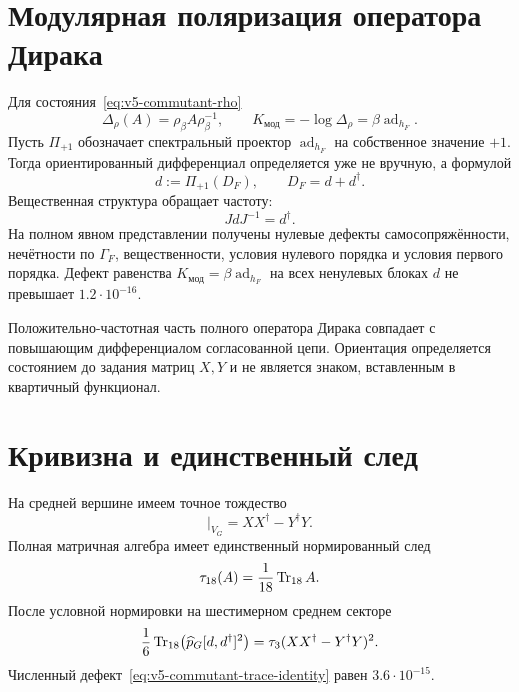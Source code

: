 \section{Модулярная поляризация оператора Дирака}

Для состояния~\eqref{eq:v5-commutant-rho}
\begin{equation}
 \Delta_\rho(A)=\rho_\beta A\rho_\beta^{-1},
 \qquad
 K_{\text{мод}}=-\log\Delta_\rho
 =\beta\operatorname{ad}_{h_F}.
\end{equation}
Пусть \(\Pi_{+1}\) обозначает спектральный проектор
\(\operatorname{ad}_{h_F}\) на собственное значение \(+1\). Тогда
ориентированный дифференциал определяется уже не вручную, а формулой
\begin{equation}
 d:=\Pi_{+1}(D_F),
 \qquad
 D_F=d+d^\dagger.
 \label{eq:v5-commutant-modular-d}
\end{equation}
Вещественная структура обращает частоту:
\begin{equation}
 JdJ^{-1}=d^\dagger.
\end{equation}
На полном явном представлении получены нулевые дефекты самосопряжённости,
нечётности по \(\Gamma_F\), вещественности, условия нулевого порядка и
условия первого порядка. Дефект равенства
\(K_{\text{мод}}=\beta\operatorname{ad}_{h_F}\) на всех ненулевых блоках
\(d\) не превышает \(1.2\cdot10^{-16}\).

\begin{proposition}
Положительно-частотная часть полного оператора Дирака совпадает с
повышающим дифференциалом согласованной цепи. Ориентация определяется
состоянием до задания матриц \(X,Y\) и не является знаком, вставленным в
квартичный функционал.
\end{proposition}

\section{Кривизна и единственный след}

На средней вершине имеем точное тождество
\begin{equation}
 [d,d^\dagger]\big|_{V_G}
 =XX^\dagger-Y^\dagger Y.
\end{equation}
Полная матричная алгебра имеет единственный нормированный след
\begin{equation}
 \tau_{18}(A)=\frac1{18}\operatorname{Tr}_{18}A.
\end{equation}
После условной нормировки на шестимерном среднем секторе
\begin{equation}
 \frac16\operatorname{Tr}_{18}\!\left(
 \widehat p_G[d,d^\dagger]^2
 \right)
 =\tau_3(XX^\dagger-Y^\dagger Y)^2.
 \label{eq:v5-commutant-trace-identity}
\end{equation}
Численный дефект~\eqref{eq:v5-commutant-trace-identity} равен
\(3.6\cdot10^{-15}\).

